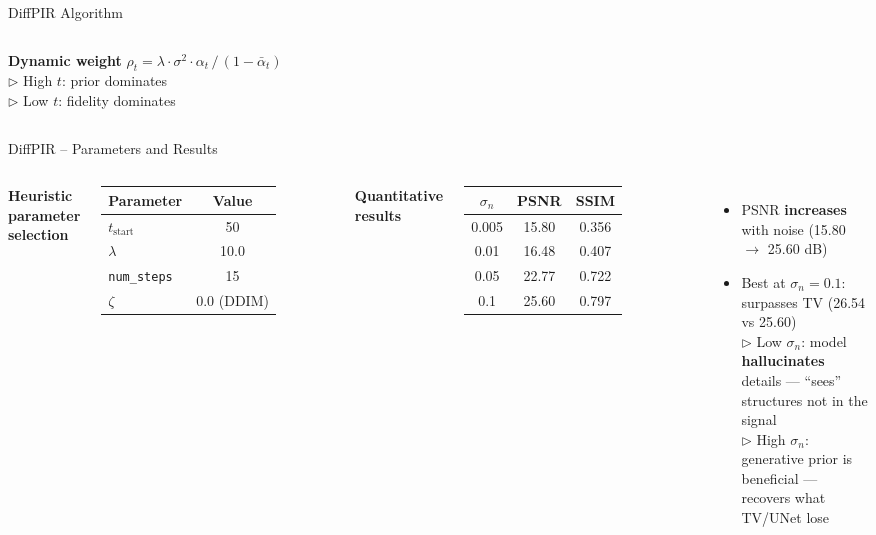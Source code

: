 \documentclass[english,10pt]{beamer}
\begin{document}
\begin{frame}{DiffPIR Algorithm}
\begin{columns}[t]
      \vspace{0.15cm}
      \textbf{Dynamic weight} $\rho_t = \lambda \cdot \sigma^2 \cdot \alpha_t\,/\,(1 - \bar{\alpha}_t)$\\[0.05cm]
      \small
      \hspace{0.3cm}$\triangleright$ High $t$: prior dominates\\[0.02cm]
      \hspace{0.3cm}$\triangleright$ Low $t$: fidelity dominates
  \end{columns}
\end{frame}

\begin{frame}{DiffPIR -- Parameters and Results}
  \begin{columns}[T]
      \textbf{Heuristic parameter selection}\\[0.15cm]
      \centering
      \begin{tabular}{lc}\toprule
        \textbf{Parameter} & \textbf{Value}\\\midrule
        $t_{\text{start}}$       & 50 \\
        $\lambda$                & 10.0 \\
        \texttt{num\_steps}      & 15 \\
        $\zeta$                  & 0.0 (DDIM) \\\bottomrule
      \end{tabular}

      \vspace{0.4cm}
      \raggedright\textbf{Quantitative results}\\[0.15cm]
      \centering
      \begin{tabular}{c|cc}\toprule
        $\sigma_n$ & \textbf{PSNR} & \textbf{SSIM}\\\midrule
        0.005 & 15.80 & 0.356\\
        0.01  & 16.48 & 0.407\\
        0.05  & 22.77 & 0.722\\
        0.1   & 25.60 & 0.797\\\bottomrule
      \end{tabular}

      \vspace{0.2cm}
      \raggedright
      \begin{itemize}\small
        \item PSNR \textbf{increases} with noise (15.80 $\to$ 25.60 dB)
        \item Best at $\sigma_n=0.1$: surpasses TV (26.54 vs 25.60)\\[0.08cm]
        \textcolor{blue!60!black}{\small $\triangleright$ Low $\sigma_n$: model \textbf{hallucinates} details --- ``sees'' structures not in the signal}\\[0.02cm]
        \textcolor{blue!60!black}{\small $\triangleright$ High $\sigma_n$: generative prior is beneficial --- recovers what TV/UNet lose}
      \end{itemize}


\end{columns}
\end{frame}
\end{document}
